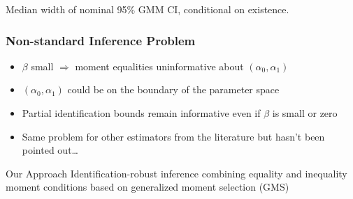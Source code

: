 \documentclass{beamer}
\begin{document}
\begin{frame}

\begin{table}[htbp]
  \scriptsize
  \centering
  
  \caption{Median width of nominal 95\% GMM CI, conditional on existence.}
\end{table}

\end{frame}
\begin{frame}
  \frametitle{Non-standard Inference Problem}

\begin{itemize}
  \item $\beta$ small $\Rightarrow$ moment equalities uninformative about $(\alpha_0, \alpha_1)$
  \item $(\alpha_0, \alpha_1)$ could be on the boundary of the parameter space
  \item Partial identification bounds remain informative even if $\beta$ is small or zero
  \item Same problem for other estimators from the literature but hasn't been pointed out\ldots
\end{itemize}

\begin{alertblock}{Our Approach}
 Identification-robust inference combining equality and inequality moment conditions based on generalized moment selection (GMS)
\end{alertblock}

\end{frame}

\end{document}
